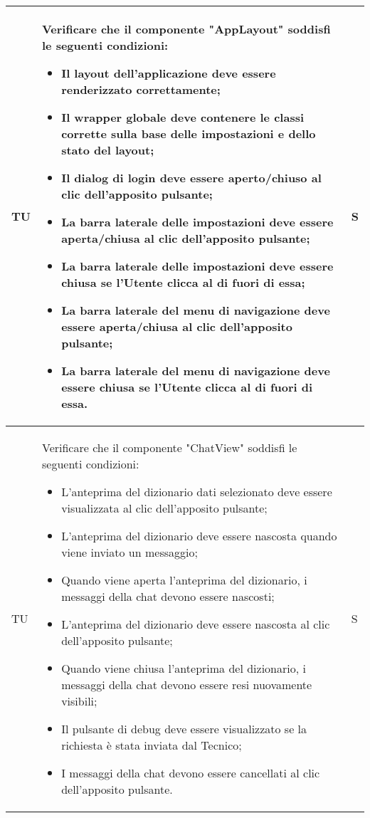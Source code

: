 \begin{adjustwidth}{-0.5cm}{-0.5cm}
\begin{longtable}{|P{1.5cm}|>{\raggedright}P{9.5cm}|>{\arraybackslash}P{1.5cm}|}
    \hline TU & Verificare che il componente "AppLayout" soddisfi le seguenti condizioni:
    \begin{itemize}
      \item Il layout dell'applicazione deve essere renderizzato correttamente;
      \item Il wrapper globale deve contenere le classi corrette sulla base delle impostazioni e dello stato del layout;
      \item Il dialog di login deve essere aperto/chiuso al clic dell'apposito pulsante;
      \item La barra laterale delle impostazioni deve essere aperta/chiusa al clic dell'apposito pulsante;
      \item La barra laterale delle impostazioni deve essere chiusa se l'Utente clicca al di fuori di essa;
      \item La barra laterale del menu di navigazione deve essere aperta/chiusa al clic dell'apposito pulsante;
      \item La barra laterale del menu di navigazione deve essere chiusa se l'Utente clicca al di fuori di essa.
    \end{itemize} & S \\
    \hline TU & Verificare che il componente "ChatView" soddisfi le seguenti condizioni:
    \begin{itemize}
      \item L'anteprima del dizionario dati selezionato deve essere visualizzata al clic dell'apposito pulsante;
      \item L'anteprima del dizionario deve essere nascosta quando viene inviato un messaggio;
      \item Quando viene aperta l'anteprima del dizionario, i messaggi della chat devono essere nascosti;
      \item L'anteprima del dizionario deve essere nascosta al clic dell'apposito pulsante;
      \item Quando viene chiusa l'anteprima del dizionario, i messaggi della chat devono essere resi nuovamente visibili;
      \item Il pulsante di debug deve essere visualizzato se la richiesta è stata inviata dal Tecnico;
      \item I messaggi della chat devono essere cancellati al clic dell'apposito pulsante.
    \end{itemize} & S \\
	\end{longtable}
\end{adjustwidth}
\egroup